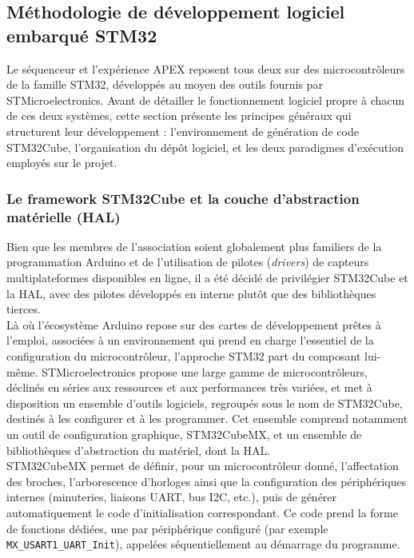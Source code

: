 \subsection{Méthodologie de développement logiciel embarqué STM32}

Le séquenceur et l'expérience APEX reposent tous deux sur des microcontrôleurs de la famille STM32, développés au moyen des
outils fournis par STMicroelectronics. Avant de détailler le fonctionnement logiciel propre à chacun de ces deux systèmes,
cette section présente les principes généraux qui structurent leur développement : l'environnement de génération de code
STM32Cube, l'organisation du dépôt logiciel, et les deux paradigmes d'exécution employés sur le projet.

\subsubsection{Le framework STM32Cube et la couche d'abstraction matérielle (\acrshort{HAL})}

Bien que les membres de l'association soient globalement plus familiers de la programmation Arduino et de l'utilisation de
pilotes (\textit{drivers}) de capteurs multiplateformes disponibles en ligne, il a été décidé de privilégier STM32Cube et la
\acrshort{HAL}, avec des pilotes développés en interne plutôt que des bibliothèques tierces.\\

Là où l'écosystème Arduino repose sur des cartes de développement prêtes à l'emploi, associées à un environnement qui prend en
charge l'essentiel de la configuration du microcontrôleur, l'approche STM32 part du composant lui-même. STMicroelectronics
propose une large gamme de microcontrôleurs, déclinés en séries aux ressources et aux performances très variées, et met à
disposition un ensemble d'outils logiciels, regroupés sous le nom de STM32Cube, destinés à les configurer et à les programmer.
Cet ensemble comprend notamment un outil de configuration graphique, STM32CubeMX, et un ensemble de bibliothèques
d'abstraction du matériel, dont la \acrfull{HAL}.\\

STM32CubeMX permet de définir, pour un microcontrôleur donné, l'affectation des broches, l'arborescence d'horloges ainsi que la
configuration des périphériques internes (minuteries, liaisons \acrshort{UART}, bus \acrshort{I2C}, etc.), puis de générer
automatiquement le code d'initialisation correspondant. Ce code prend la forme de fonctions dédiées, une par périphérique
configuré (par exemple \texttt{MX\_USART1\_UART\_Init}), appelées séquentiellement au démarrage du programme.


